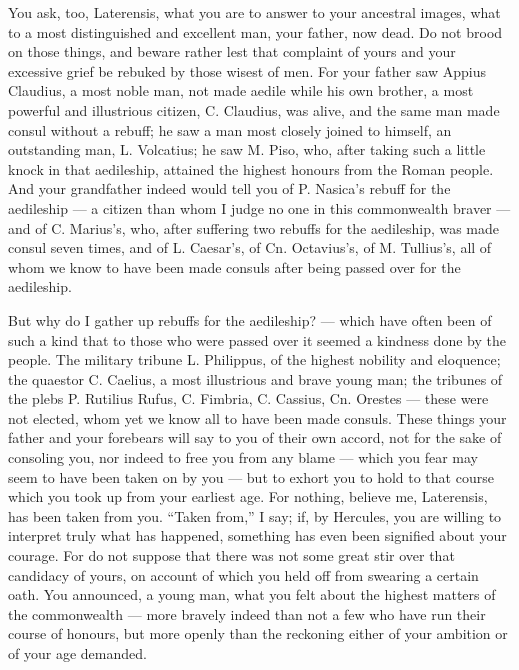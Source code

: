  You ask, too, Laterensis, what you are to answer to your ancestral images, what to a most distinguished and excellent man, your father, now dead. Do not brood on those things, and beware rather lest that complaint of yours and your excessive grief be rebuked by those wisest of men. For your father saw Appius Claudius, a most noble man, not made aedile while his own brother, a most powerful and illustrious citizen, C. Claudius, was alive, and the same man made consul without a rebuff; he saw a man most closely joined to himself, an outstanding man, L. Volcatius; he saw M. Piso, who, after taking such a little knock in that aedileship, attained the highest honours from the Roman people. And your grandfather indeed would tell you of P. Nasica's rebuff for the aedileship --- a citizen than whom I judge no one in this commonwealth braver --- and of C. Marius's, who, after suffering two rebuffs for the aedileship, was made consul seven times, and of L. Caesar's, of Cn. Octavius's, of M. Tullius's, all of whom we know to have been made consuls after being passed over for the aedileship.

 But why do I gather up rebuffs for the aedileship? --- which have often been of such a kind that to those who were passed over it seemed a kindness done by the people. The military tribune L. Philippus, of the highest nobility and eloquence; the quaestor C. Caelius, a most illustrious and brave young man; the tribunes of the plebs P. Rutilius Rufus, C. Fimbria, C. Cassius, Cn. Orestes --- these were not elected, whom yet we know all to have been made consuls. These things your father and your forebears will say to you of their own accord, not for the sake of consoling you, nor indeed to free you from any blame --- which you fear may seem to have been taken on by you --- but to exhort you to hold to that course which you took up from your earliest age. For nothing, believe me, Laterensis, has been taken from you. ``Taken from,'' I say; if, by Hercules, you are willing to interpret truly what has happened, something has even been signified about your courage. For do not suppose that there was not some great stir over that candidacy of yours, on account of which you held off from swearing a certain oath. You announced, a young man, what you felt about the highest matters of the commonwealth --- more bravely indeed than not a few who have run their course of honours, but more openly than the reckoning either of your ambition or of your age demanded.

